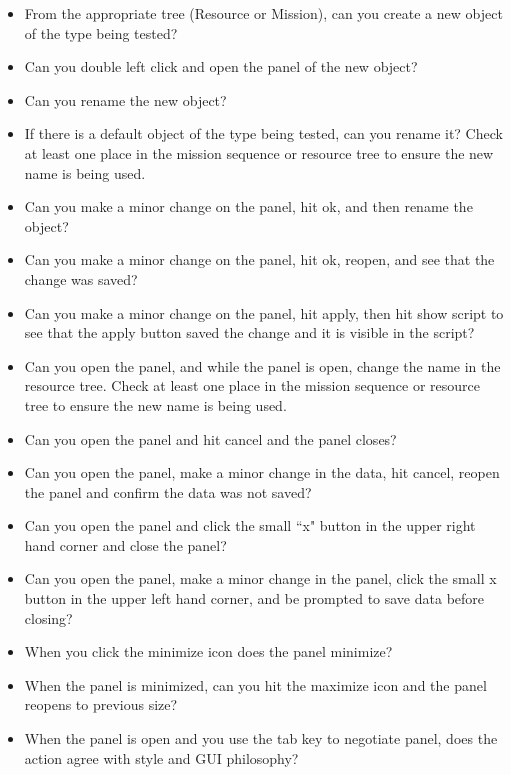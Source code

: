 \begin{itemize}
    \item From the appropriate tree (Resource or Mission), can you create a new object of the type being tested?
    \item Can you double left click and open the panel of the new
    object?
    \item Can you rename the new object?
    \item If there is a default object of the type being tested, can you rename
    it?  Check at least one place in the mission sequence or resource tree to
    ensure the new name is being used.
    \item Can you make a minor change on the panel, hit ok, and then rename the object?
    \item Can you make a minor change on the panel, hit ok, reopen,
    and see that the change was saved?
    \item Can you make a minor change on the panel, hit apply, then
    hit show script to see that the apply button saved the change
    and  it is visible in the script?
    \item Can you open the panel, and while the panel is open,
    change the name in the resource tree.  Check at least one place in the mission sequence or resource tree to
    ensure the new name is being used.
    \item Can you open the panel and hit cancel and the panel
    closes?
    \item Can you open the panel, make a minor change in the data,
    hit cancel, reopen the panel and confirm the data was not saved?
    \item Can you open the panel and
    click the small ``x" button in the upper right hand corner and close the panel?
    \item Can you open the panel, make a minor change in the panel,
    click the small x button in the upper left hand corner, and be
    prompted to save data before closing?
    \item When you click the minimize icon does the panel minimize?
    \item When the panel is minimized, can you hit the maximize icon
     and the panel reopens to previous size?
    \item When the panel is open and you use the tab key to
    negotiate panel, does the action agree with style and GUI
    philosophy?
\end{itemize}
\vspace{.25 in}


